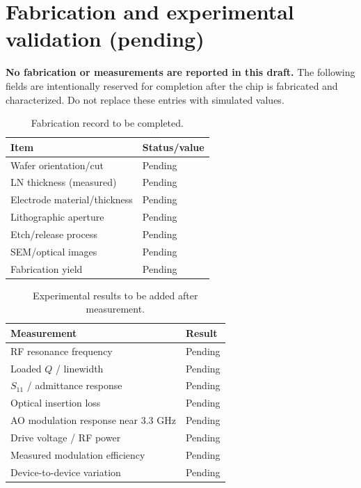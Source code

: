\documentclass[10pt,twocolumn]{article}
\begin{document}
\section{Fabrication and experimental validation (pending)}
\textbf{No fabrication or measurements are reported in this draft.} The following fields are intentionally reserved for completion after the chip is fabricated and characterized. Do not replace these entries with simulated values.
\begin{table}[h]\centering\caption{Fabrication record to be completed.}\label{tab:fabrication}\begin{tabular}{@{}p{}p{}@{}}\toprule
Item & Status/value\\\midrule
Wafer orientation/cut & Pending\\
LN thickness (measured) & Pending\\
Electrode material/thickness & Pending\\
Lithographic aperture & Pending\\
Etch/release process & Pending\\
SEM/optical images & Pending\\
Fabrication yield & Pending\\\bottomrule\end{tabular}\end{table}
\begin{table}[h]\centering\caption{Experimental results to be added after measurement.}\label{tab:measurements}\begin{tabular}{@{}p{}p{}@{}}\toprule
Measurement & Result\\\midrule
RF resonance frequency & Pending\\
Loaded $Q$ / linewidth & Pending\\
$S_{11}$ / admittance response & Pending\\
Optical insertion loss & Pending\\
AO modulation response near 3.3 GHz & Pending\\
Drive voltage / RF power & Pending\\
Measured modulation efficiency & Pending\\
Device-to-device variation & Pending\\\bottomrule\end{tabular}\end{table}
\end{document}
